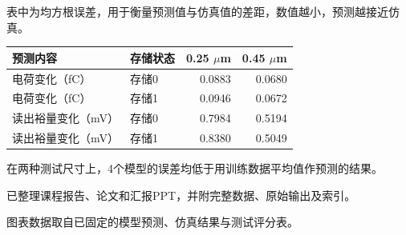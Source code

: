 \documentclass[UTF8,fontset=fandol,10pt,a4paper]{ctexart}
\newcommand{\sect}[1]{\par\vspace{9pt}{\large\bfseries #1}\par\vspace{4pt}}
\newcommand{\note}[1]{\par{\footnotesize\color{muted}#1}\par}
\begin{document}
\sect{测试误差}
\note{表中为均方根误差，用于衡量预测值与仿真值的差距，数值越小，预测越接近仿真。}
\renewcommand{\arraystretch}{1.4}
\begin{tabularx}{\textwidth}{@{}Xlrr@{}}
\toprule
预测内容 & 存储状态 & 0.25 $\mu$m & 0.45 $\mu$m \\
\midrule
电荷变化（fC） & 存储0 & 0.0883 & 0.0680 \\
电荷变化（fC） & 存储1 & 0.0946 & 0.0672 \\
读出裕量变化（mV） & 存储0 & 0.7984 & 0.5194 \\
读出裕量变化（mV） & 存储1 & 0.8380 & 0.5049 \\
\bottomrule
\end{tabularx}\par
\vspace{9pt}
在两种测试尺寸上，4个模型的误差均低于用训练数据平均值作预测的结果。

\vfill
\sect{现有材料}
已整理课程报告、论文和汇报PPT，并附完整数据、原始输出及索引。
\note{图表数据取自已固定的模型预测、仿真结果与测试评分表。}
\end{document}
